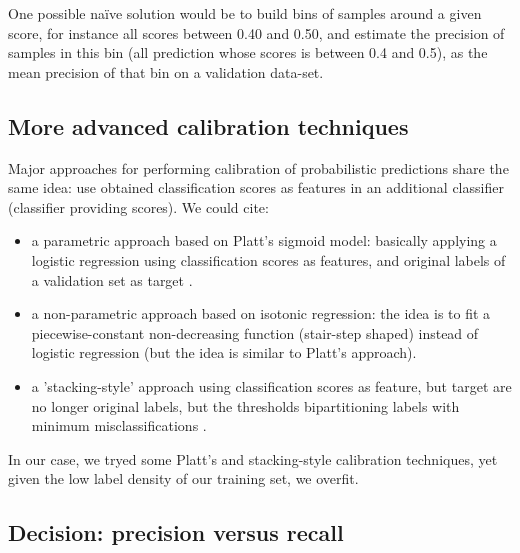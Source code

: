 One possible naïve solution would be to build bins of samples around a given score, for instance all scores between 0.40 and 0.50, and estimate the precision of samples in this bin (all prediction whose scores is between 0.4 and 0.5), as the mean precision of that bin on a validation data-set.

\subsection{More advanced calibration techniques}

Major approaches for performing calibration of probabilistic predictions share the same idea: use obtained classification scores as features in an additional classifier (classifier providing scores). We could cite: 
\begin{itemize}
	\item a parametric approach based on Platt’s sigmoid model: basically applying a logistic regression using classification scores as features, and original labels of a validation set as target \cite{Calibration}.
	\item a non-parametric approach based on isotonic regression: the idea is to fit a piecewise-constant non-decreasing function (stair-step shaped) instead of logistic regression (but the idea is similar to Platt's approach).
	\item a 'stacking-style' approach using classification scores as feature, but target are no longer original labels, but the thresholds bipartitioning labels with minimum misclassifications \cite{MultilabelReview}.
\end{itemize}

In our case, we tryed some Platt's and stacking-style calibration techniques, yet given the low label density of our training set, we overfit.

\subsection{Decision: precision versus recall}

